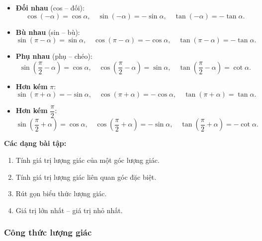 \documentclass[12pt,a4paper]{article}
\begin{document}
\begin{congthuc}[title={Các góc liên quan đặc biệt}]
  \begin{itemize}
    \item \textbf{Đối nhau} (cos -- đối):
      \[
        \cos(-\alpha) = \cos\alpha,\quad
        \sin(-\alpha) = -\sin\alpha,\quad
        \tan(-\alpha) = -\tan\alpha.
      \]
    \item \textbf{Bù nhau} (sin -- bù):
      \[
        \sin(\pi - \alpha) = \sin\alpha,\quad
        \cos(\pi - \alpha) = -\cos\alpha,\quad
        \tan(\pi - \alpha) = -\tan\alpha.
      \]
    \item \textbf{Phụ nhau} (phụ -- chéo):
      \[
        \sin\!\left(\dfrac{\pi}{2} - \alpha\right) = \cos\alpha,\quad
        \cos\!\left(\dfrac{\pi}{2} - \alpha\right) = \sin\alpha,\quad
        \tan\!\left(\dfrac{\pi}{2} - \alpha\right) = \cot\alpha.
      \]
    \item \textbf{Hơn kém} $\pi$:
      \[
        \sin(\pi + \alpha) = -\sin\alpha,\quad
        \cos(\pi + \alpha) = -\cos\alpha,\quad
        \tan(\pi + \alpha) = \tan\alpha.
      \]
    \item \textbf{Hơn kém} $\dfrac{\pi}{2}$:
      \[
        \sin\!\left(\dfrac{\pi}{2} + \alpha\right) = \cos\alpha,\quad
        \cos\!\left(\dfrac{\pi}{2} + \alpha\right) = -\sin\alpha,\quad
        \tan\!\left(\dfrac{\pi}{2} + \alpha\right) = -\cot\alpha.
      \]
  \end{itemize}
\end{congthuc}

\medskip\noindent\textbf{Các dạng bài tập:}
\begin{enumerate}[label=\textbf{Dạng \arabic*:}, leftmargin=*, align=left]
  \item Tính giá trị lượng giác của một góc lượng giác.
  \item Tính giá trị lượng giác liên quan góc đặc biệt.
  \item Rút gọn biểu thức lượng giác.
  \item Giá trị lớn nhất -- giá trị nhỏ nhất.
\end{enumerate}

\subsubsection{Công thức lượng giác}
\end{document}
